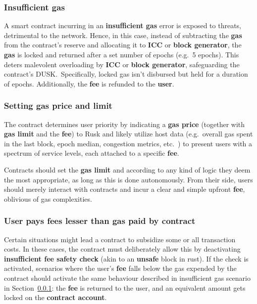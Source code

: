 \documentclass[twocolumn, nofootinbib]{revtex4-2} %
\newcommand{\dusk}{{\footnotesize\textsf{DUSK}}\xspace}
\newcommand{\emphasize}[1]{\textbf{#1}\xspace}
\newcommand{\blockgenerator}{\emphasize{block generator}}
\newcommand{\contractaccount}{\emphasize{contract account}}
\newcommand{\fee}{\emphasize{fee}}
\newcommand{\gas}{\emphasize{gas}}
\newcommand{\gasprice}{\emphasize{gas price}}
\newcommand{\gaslimit}{\emphasize{gas limit}}
\newcommand{\insufficientgas}{\emphasize{insufficient gas}}
\newcommand{\icc}{\emphasize{ICC}}
\newcommand{\user}{\emphasize{user}}
\begin{document}
    \subsubsection{Insufficient gas}\label{sec:specifications:scenario-3:insufficient-gas}
    A smart contract incurring in an \insufficientgas error is exposed
    to threats, detrimental to the network.
    Hence, in this case, instead of subtracting the \gas from the
    contract's reserve and allocating it to \icc or
    \blockgenerator, the \gas is locked and returned after a
    set number of epochs (e.g.\ 5 epochs).
    This deters malevolent overloading by \icc or
    \blockgenerator, safeguarding the contract's \dusk.\
    Specifically, locked gas isn't disbursed but held for a duration of epochs.
    Additionally, the \fee is refunded to the \user.

    \subsubsection{Setting gas price and limit}\label{sec:specifications:scenario-3:setting-gas-price-and-limit}
    The contract determines user priority by indicating a \gasprice
    (together with \gaslimit and the \fee) to Rusk and likely
    utilize host data (e.g.\ overall gas spent in the last block, epoch median,
    congestion metrics, etc.\ ) to present users with a spectrum of service
    levels, each attached to a specific \fee.

    Contracts should set the \gaslimit and  according
    to any kind of logic they deem the most appropriate, as long as this is done
    autonomously.
    From their side, users should merely interact with contracts and incur a
    clear and simple upfront \fee, oblivious of gas complexities.

    \subsubsection{User pays fees lesser than gas paid by contract}\label{sec:specifications:scenario-3:user-pays-fees-lesser}
    Certain situations might lead a contract to subsidize some or all
    transaction costs.
    In these cases, the contract must deliberately allow this by deactivating
    \textbf{insufficient fee safety check} (akin to an \textbf{unsafe} block in
    rust).
    If the check is activated, scenarios where the user's \fee falls below the
    gas expended by the contract should activate the same behaviour described
    in insufficient gas scenario in Section~\ref{sec:specifications:scenario-3:insufficient-gas}: the
    \fee is returned to the user, and an equivalent amount gets locked
    on the \contractaccount.
\end{document}
